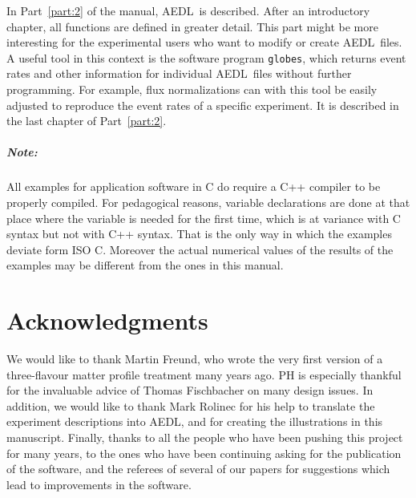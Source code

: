 \documentclass[a4paper,12pt,twoside]{book}
\newcommand{\Part}{Part}
\newcommand{\AEDL}{{\sf AEDL}}
\begin{document}
In \Part~\ref{part:2} of the manual, \AEDL\ is described. After an
introductory chapter, all functions are defined in greater detail.
This part might be more interesting for the experimental users who
want to modify or create \AEDL\ files. A useful tool in this context
is the software program \verb+globes+, which returns event rates and other
information for individual \AEDL\ files without further programming. 
For example, flux normalizations can with this tool be easily adjusted 
to reproduce the event rates of a specific experiment. It is described
in the last chapter of \Part~\ref{part:2}.


\paragraph{Note:} All examples for application software in C do require
a C++ compiler to be properly compiled. For pedagogical reasons, variable
declarations are done at that place where the variable is needed for the
first time, which is at variance with C syntax but not with C++ syntax.
That is the only way in which the examples deviate form ISO C. Moreover
the actual numerical values of the results of the examples may be different
from the ones in this manual. 

\mainmatter







%


\backmatter
\chapter*{Acknowledgments}

We would like to thank Martin Freund, who wrote the very first
version of a three-flavour matter profile treatment many years ago.
PH is especially thankful for the invaluable advice of Thomas Fischbacher on
many design issues.
In addition, we would like to thank
Mark Rolinec for his help to translate the experiment descriptions
into \AEDL, and for creating the illustrations in this manuscript.
Finally, thanks to all the people who have been pushing this project
for many years, to the ones who have been continuing asking for the
publication of the software, and the referees of several of our
papers for suggestions which lead to improvements in the software.
\end{document}
